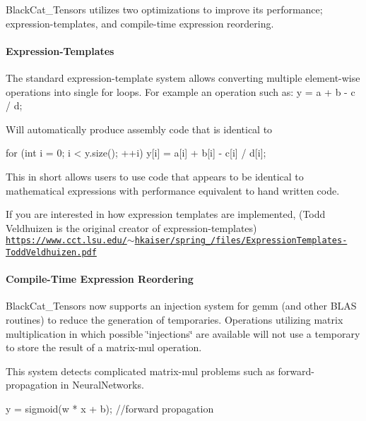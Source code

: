 Black\+Cat\+\_\+\+Tensor\textquotesingle{}s utilize\textquotesingle{}s two optimizations to improve its performance; expression-\/templates, and compile-\/time expression reordering.

\paragraph*{Expression-\/\+Templates}

The standard expression-\/template system allows converting multiple element-\/wise operations into single for loops. For example an operation such as\+: y = a + b -\/ c / d;

Will automatically produce assembly code that is identical to


\begin{DoxyCode}
\textcolor{keywordflow}{for} (\textcolor{keywordtype}{int} i = 0; i < y.size(); ++i)
    y[i] = a[i] + b[i] - c[i] / d[i];
\end{DoxyCode}


This in short allows users to use code that appears to be identical to mathematical expressions with performance equivalent to hand written code.

If you are interested in how expression templates are implemented, (Todd Veldhuizen is the original creator of expression-\/templates) \href{https://www.cct.lsu.edu/~hkaiser/spring_2012/files/ExpressionTemplates-ToddVeldhuizen.pdf}{\tt https\+://www.\+cct.\+lsu.\+edu/$\sim$hkaiser/spring\+\_/files/\+Expression\+Templates-\/\+Todd\+Veldhuizen.\+pdf}

\paragraph*{Compile-\/\+Time Expression Reordering}

Black\+Cat\+\_\+\+Tensor\textquotesingle{}s now supports an injection system for gemm (and other B\+L\+AS routines) to reduce the generation of temporaries. Operations utilizing matrix multiplication in which possible \char`\"{}injections\char`\"{} are available will not use a temporary to store the result of a matrix-\/mul operation.

This system detects complicated matrix-\/mul problems such as forward-\/propagation in Neural\+Networks.


\begin{DoxyCode}
y = sigmoid(w * x + b);     \textcolor{comment}{//forward propagation}
\end{DoxyCode}


